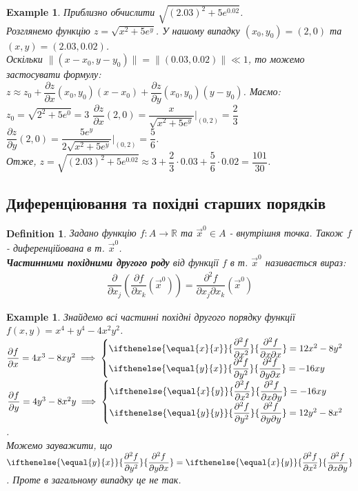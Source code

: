 \documentclass[a4paper, 10pt]{article}
\def\departial#1#2{\dfrac{\partial {#1}}{\partial {#2}}}
\def\seconddepartial#1#2#3{\ifthenelse{\equal{#2}{#3}}{\dfrac{\partial^2 {#1}}{\partial {#2}^2}}{\dfrac{\partial^2 {#1}}{\partial {#2} \partial {#3}}}}
\theoremstyle{theoremdd}
\theoremstyle{theoremdd}
\theoremstyle{theoremdd}
\newtheorem{definition}[theorem]{Definition}
\theoremstyle{theoremdd}
\theoremstyle{theoremdd}
\newtheorem{example}[theorem]{Example}
\theoremstyle{theoremdd}
\theoremstyle{theoremdd}
\theoremstyle{theoremdd}
\theoremstyle{theoremdd}
\newcommand\Norm[1]{\lVert#1\rVert}
\begin{document}
\begin{example}
Приблизно обчислити $\sqrt{(2.03)^2 + 5e^{0.02}}$.\\
Розглянемо функцію $z = \sqrt{x^2+5e^y}$. У нашому випадку $(x_0,y_0) = (2,0)$ та $(x,y) = (2.03,0.02)$.\\
Оскільки $\Norm{(x-x_0,y-y_0)} = \Norm{(0.03,0.02)} \ll 1$, то можемо застосувати формулу:\\
$z \approx z_0 + \departial{z}{x}(x_0,y_0)(x-x_0) + \departial{z}{y}(x_0,y_0)(y-y_0)$. Маємо: \\ $z_0 = \sqrt{2^2+5e^0} = 3$ \hspace{1cm} $\departial{z}{x}(2,0) = \dfrac{x}{\sqrt{x^2+5e^y}} \Big|_{(0,2)} = \dfrac{2}{3}$ \hspace{1cm} $\departial{z}{y}(2,0) = \dfrac{5e^y}{2\sqrt{x^2+5e^y}} \Big|_{(0,2)} = \dfrac{5}{6}$.\\
Отже, $z = \sqrt{(2.03)^2 + 5e^{0.02}} \approx 3 + \dfrac{2}{3} \cdot 0.03 + \dfrac{5}{6} \cdot 0.02 = \dfrac{101}{30}$.
\end{example}

\subsection{Диференціювання та похідні старших порядків}
\begin{definition}
Задано функцію $f: A \to \mathbb{R}$ та $\vec{x}^0 \in A$ - внутрішня точка. Також $f$ - диференційована в т. $\vec{x}^0$.\\
\textbf{Частинними похідними другого роду} від функції $f$ в т. $\vec{x}^0$ називається вираз:
\begin{align*}
\dfrac{\partial}{\partial x_j} \left( \dfrac{\partial f}{\partial x_k} (\vec{x}^0) \right) = \dfrac{\partial^2 f}{\partial x_j \partial x_k} (\vec{x}^0)
\end{align*}
\end{definition}

\begin{example}
Знайдемо всі частинні похідні другого порядку функції $f(x,y) = x^4+y^4-4x^2y^2$.\\
$\departial{f}{x} = 4x^3 - 8xy^2 \implies \begin{cases} \seconddepartial{f}{x}{x} = 12x^2 - 8y^2 \\ \seconddepartial{f}{y}{x} = -16xy \end{cases}$ \hspace{1cm} $\departial{f}{y} = 4y^3 - 8x^2y \implies \begin{cases} \seconddepartial{f}{x}{y} = -16xy \\ \seconddepartial{f}{y}{y} = 12y^2-8x^2 \end{cases}$.\\
Можемо зауважити, що $\seconddepartial{f}{y}{x} = \seconddepartial{f}{x}{y}$. Проте в загальному випадку це не так.
\end{example}
\end{document}
